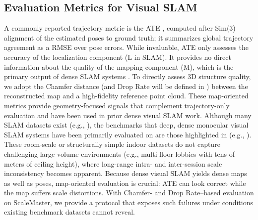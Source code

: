 \subsection{Evaluation Metrics for Visual \ac{SLAM}}
\label{sec:rel3}
A commonly reported trajectory metric is the \ac{ATE} \cite{Zhang18iros}, computed after Sim(3) alignment of the estimated poses to ground truth; it summarizes global trajectory agreement as a \ac{RMSE} over pose errors. While invaluable, \ac{ATE} only assesses the accuracy of the localization component (L in \ac{SLAM}). It provides no direct information about the quality of the mapping component (M), which is the primary output of dense \ac{SLAM} systems \cite{li2023dense}. To directly assess 3D structure quality, we adopt the Chamfer distance \cite{murai2025mast3r} (and Drop Rate will be defined in ) between the reconstructed map and a high-fidelity reference point cloud. These map-oriented metrics provide geometry-focused signals that complement trajectory-only evaluation and have been used in prior dense visual SLAM work. Although many \ac{SLAM} datasets exist (e.g., \cite{wei2025fusionportablev2,chen2024heterogeneous}), the benchmarks that deep, dense monocular visual SLAM systems have been primarily evaluated on are those highlighted in  (e.g., \cite{sturm2012benchmark,burri2016euroc,glocker2013real}). These room-scale or structurally simple indoor datasets do not capture challenging large-volume environments (e.g., multi-floor lobbies with tens of meters of ceiling height), where long-range intra- and inter-session scale inconsistency becomes apparent. Because dense visual SLAM yields dense maps as well as poses, map-oriented evaluation is crucial: ATE can look correct while the map suffers scale distortions. With Chamfer- and Drop Rate–based evaluation on ScaleMaster, we provide a protocol that exposes such failures under conditions existing benchmark datasets cannot reveal.


